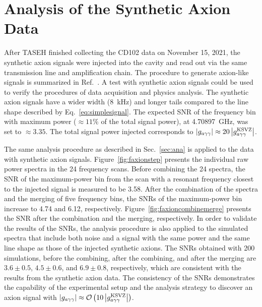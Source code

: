 \section{Analysis of the Synthetic Axion Data}\label{sec:faxion}
After TASEH finished collecting the CD102 data on November 15, 2021, 
the synthetic axion signals were injected into the cavity and read out via the 
same transmission line and amplification chain. The procedure 
to generate axion-like signals is summarized in 
Ref.~\cite{TASEHInstrumentation}. 
A test with synthetic axion signals could be used to verify the procedures of 
data acquisition and physics analysis. The synthetic axion signals 
have a wider width (8~kHz) and longer tails compared to the line shape 
described by Eq.~\eqref{eq:simplesignal}. 
The expected SNR of the frequency bin with maximum power ($\approx 11\%$ of 
the total signal power), 
 at 4.70897~GHz, was set to $\approx 3.35$. 
The total signal power injected 
corresponds to $\left|g_{a\gamma\gamma}\right|\approx 20 \left|g_{a\gamma\gamma}^\text{KSVZ}\right|$. 

The same analysis procedure as described in Sec.~\ref{sec:ana} is applied 
to the data with synthetic axion signals. 
Figure~\ref{fig:faxionstep} presents the individual raw power spectra in 
the 24 frequency scans. Before combining 
the 24 spectra, the SNR of the maximum-power bin from the scan with a resonant 
frequency closest to the injected signal is measured to be 
3.58. 
After the combination of the spectra and the merging of five frequency 
bins, the SNRs of the maximum-power bin increase to 4.74 and 6.12, 
respectively. Figure~\ref{fig:faxioncombinemerge} presents 
the SNR after the combination and the merging, respectively.    
In order to 
validate the results of the SNRs, the analysis procedure is also applied  
to the simulated spectra that include both noise and a signal with the 
same power and the same line shape as those of the injected synthetic axions. 
The SNRs obtained with 200 simulations, before 
the combining, after the combining, and after the merging are %
$3.6\pm 0.5$, $4.5\pm0.6$, and $6.9\pm0.8$, respectively, 
which are 
consistent with the results from the synthetic axion data.  
The consistency of the SNRs demonstrates 
the capability of the experimental setup and the analysis strategy to discover 
an axion signal with 
$\left|g_{a\gamma\gamma}\right|\approx {\cal O}\left(10\left|g_{a\gamma\gamma}^\text{KSVZ}\right|\right)$.


